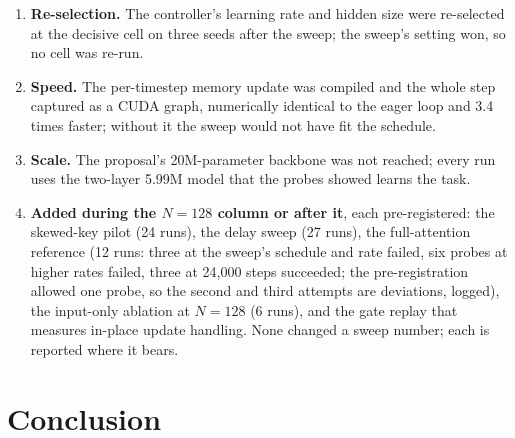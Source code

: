 \documentclass[conference]{IEEEtran}
\begin{document}
\begin{enumerate}
\item \textbf{Re-selection.} The controller's learning rate and hidden size
were re-selected at the decisive cell on three seeds after the sweep; the
sweep's setting won, so no cell was re-run.
\item \textbf{Speed.} The per-timestep memory update was compiled and the
whole step captured as a CUDA graph, numerically identical to the eager loop
and 3.4 times faster; without it the sweep would not have fit the schedule.
\item \textbf{Scale.} The proposal's 20M-parameter backbone was not reached;
every run uses the two-layer 5.99M model that the probes showed learns the
task.
\item \textbf{Added during the $N = 128$ column or after it}, each
pre-registered: the skewed-key pilot (24 runs), the delay sweep (27 runs), the
full-attention reference (12
runs: three at the sweep's schedule and rate failed, six probes at higher
rates failed, three at 24{,}000 steps succeeded; the pre-registration allowed
one probe, so the second and third attempts are deviations, logged), the
input-only ablation at $N = 128$ (6 runs), and the gate replay that measures
in-place update handling. None changed a sweep number; each is reported where
it bears.
\end{enumerate}

\section{Conclusion}
\label{sec:conclusion}
\end{document}
